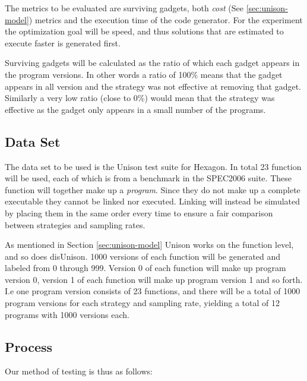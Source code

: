 The metrics to be evaluated are surviving gadgets, both \textit{cost} (See
\ref{sec:unison-model}) metrics and the execution time of the code generator. For the
experiment the optimization goal will be speed, and thus solutions that are estimated to
execute faster is generated first.

Surviving gadgets will be calculated as the ratio of which each gadget appears in the program
versions. In other words a ratio of 100\% means that the gadget appears in all version
and the strategy was not effective at removing that gadget. Similarly a very low ratio
(close to 0\%) would mean that the strategy was effective as the gadget only appears in
a small number of the programs.

\subsection{Data Set}

The data set to be used is the Unison test suite for Hexagon. In total 23 function will be
used, each of which is from a benchmark in the SPEC2006 suite. These function will together
make up a \textit{program}. Since they do not make up a complete executable they cannot be
linked nor executed. Linking will instead be simulated by placing them in the same order
every time to ensure a fair comparison between strategies and sampling rates.

As mentioned in Section \ref{sec:unison-model} Unison works on the function level, and so
does disUnison. 1000 versions of each function will be generated and labeled from 0 through
999. Version 0 of each function will make up program version 0, version 1 of each
function will make up program version 1 and so forth. I.e one program version consists of
23 functions, and there will be a total of 1000 program versions for each strategy and
sampling rate, yielding a total of 12 programs with 1000 versions each.

\subsection{Process}


Our method of testing is thus as follows:

